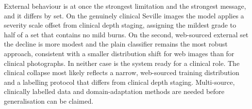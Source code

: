 \documentclass{melba}
\begin{document}
External behaviour is at once the strongest limitation and the strongest message, and it differs by set. On the genuinely clinical Seville images the model applies a severity scale offset from clinical depth staging, assigning the mildest grade to half of a set that contains no mild burns. On the second, web-sourced external set the decline is more modest and the plain classifier remains the most robust approach, consistent with a smaller distribution shift for web images than for clinical photographs. In neither case is the system ready for a clinical role. The clinical collapse most likely reflects a narrow, web-sourced training distribution and a labelling protocol that differs from clinical depth staging. Multi-source, clinically labelled data and domain-adaptation methods are needed before generalisation can be claimed.
\end{document}
